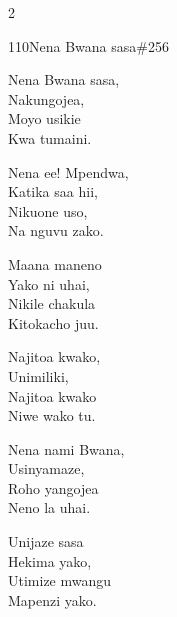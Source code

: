 \begin{multicols}{2}
\begin{hymn}{110}{Nena Bwana sasa}{\#256}
\begin{stanza}
Nena Bwana sasa,\\
Nakungojea,\\
Moyo usikie\\
Kwa tumaini.
\end{stanza}
\begin{stanza}
Nena ee! Mpendwa,\\
Katika saa hii,\\
Nikuone uso,\\
Na nguvu zako.
\end{stanza}
\begin{stanza}
Maana maneno\\
Yako ni uhai,\\
Nikile chakula\\
Kitokacho juu.
\end{stanza}
\begin{stanza}
Najitoa kwako,\\
Unimiliki,\\
Najitoa kwako\\
Niwe wako tu.
\end{stanza}
\begin{stanza}
Nena nami Bwana,\\
Usinyamaze,\\
Roho yangojea\\
Neno la uhai.
\end{stanza}
\begin{stanza}
Unijaze sasa\\
Hekima yako,\\
Utimize mwangu\\
Mapenzi yako.
\end{stanza}
\end{hymn}


\end{multicols}
